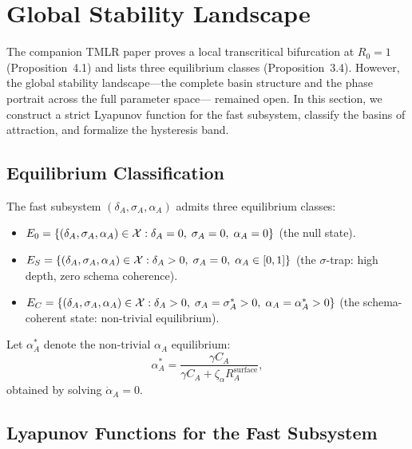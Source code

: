 
\section{Global Stability Landscape}
\label{sec:stability}

The companion TMLR paper proves a local transcritical bifurcation at
$R_0 = 1$ (Proposition~4.1) and lists three equilibrium classes
(Proposition~3.4). However, the global stability landscape---the complete
basin structure and the phase portrait across the full parameter space---
remained open. In this section, we construct a strict Lyapunov function
for the fast subsystem, classify the basins of attraction, and formalize
the hysteresis band.

\subsection{Equilibrium Classification}

\begin{definition}
\label{def:equilibria}
The fast subsystem $(\delta_A, \sigma_A, \alpha_A)$ admits three
equilibrium classes:
\begin{itemize}
\item $E_0 = \{ (\delta_A, \sigma_A, \alpha_A) \in \mathcal{X} : \delta_A = 0,\;
  \sigma_A = 0,\; \alpha_A = 0 \}$ (the null state).
\item $E_S = \{ (\delta_A, \sigma_A, \alpha_A) \in \mathcal{X} :
  \delta_A > 0,\; \sigma_A = 0,\; \alpha_A \in [0,1] \}$
  (the $\sigma$-trap: high depth, zero schema coherence).
\item $E_C = \{ (\delta_A, \sigma_A, \alpha_A) \in \mathcal{X} :
  \delta_A > 0,\; \sigma_A = \sigma^*_A > 0,\; \alpha_A = \alpha^*_A > 0 \}$
  (the schema-coherent state: non-trivial equilibrium).
\end{itemize}
\end{definition}

Let $\alpha^*_A$ denote the non-trivial $\alpha_A$ equilibrium:
\[
\alpha^*_A = \frac{\gamma C_A}{\gamma C_A + \zeta_\alpha R_A^{\mathrm{surface}}},
\]
obtained by solving $\dot{\alpha}_A = 0$.

\subsection{Lyapunov Functions for the Fast Subsystem}

